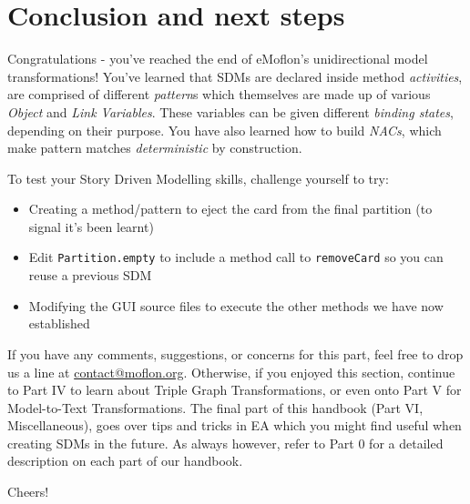 \genHeader
\section{Conclusion and next steps}

\vspace{0.5cm}

Congratulations - you've reached the end of eMoflon's unidirectional model transformations! You've learned that SDMs are declared inside method
\emph{activities}, are comprised of different \emph{pattern}s which themselves are made up of various \emph{Object} and \emph{Link Variables}. These
variables can be given different \emph{binding states}, depending on their purpose. You have also learned how to build \emph{NACs}, which make pattern
matches \emph{deterministic} by construction.

\vspace{0.5cm}

To test your Story Driven Modelling skills, challenge yourself to try:
\begin{itemize}
\item Creating a method/pattern to eject the card from the final partition (to signal it's been learnt)
\item Edit \texttt{Partition.empty} to include a method call to \texttt{removeCard} so you can reuse a previous SDM
\item Modifying the GUI source files to execute the other methods we have now established
\end{itemize}

\vspace{0.5cm}
	
If you have any comments, suggestions, or concerns for this part, feel free to drop us a line at \href{mailto:contact@moflon.org}{contact@moflon.org}.
Otherwise, if you enjoyed this section, continue to Part IV to learn about Triple Graph Transformations, or even onto Part V for Model-to-Text Transformations.
The final part of this handbook (Part VI, Miscellaneous), goes over tips and tricks in EA which you might find useful when creating SDMs in the future. As
always however, refer to Part 0 for a detailed description on each part of our handbook.

\vspace{0.5cm}


Cheers!
